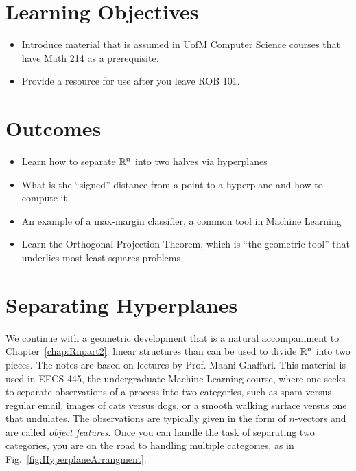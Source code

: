 \section*{Learning Objectives}
\begin{itemize}
\item Introduce material that is assumed in UofM Computer Science courses that have Math 214 as a prerequisite.
\item Provide a resource for use after you leave ROB 101.
\end{itemize}

\section*{Outcomes}
\begin{itemize}
\item Learn how to separate $\mathbb R^n$ into two halves via hyperplanes
\item What is the ``signed'' distance from a point to a hyperplane and how to compute it
\item An example of a max-margin classifier, a common tool in Machine Learning
\item Learn the Orthogonal Projection Theorem, which is ``the geometric tool'' that underlies most least squares problems
\end{itemize}


\vspace*{1.5cm}





\newpage

  
\section{Separating Hyperplanes}
\label{sec:SeparatingHyperplanes}


We continue with a geometric development that is a natural accompaniment to Chapter~\ref{chap:Rnpart2}: linear structures than can be used to divide $\mathbb R^n$ into two pieces. The notes are based on lectures by Prof. Maani Ghaffari. This material is used in EECS 445, the undergraduate Machine Learning course, where one seeks to separate observations of a process into two categories, such as spam versus regular email, images of cats versus dogs, or a smooth walking surface versus one that undulates. The observations are typically given in the form of $n$-vectors and are called \textit{object features}. Once you can handle the task of separating two categories, you are on the road to handling multiple categories, as in Fig.~\ref{fig:HyperplaneArrangment}.\\

